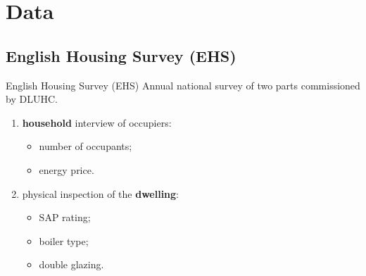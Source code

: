 \section{Data}

\subsection{English Housing Survey (EHS)}

\begin{frame}{English Housing Survey (EHS)}
    Annual national survey of two parts commissioned by 
    DLUHC.

    \begin{enumerate}
        \item \textbf{household} interview of occupiers:
        \begin{itemize}
            \item number of occupants;
            \item energy price.
        \end{itemize}

        \pause

        \item physical inspection of the \textbf{dwelling}:
        \begin{itemize}
            \item SAP rating;
            \item boiler type;
            \item double glazing.
        \end{itemize}
    \end{enumerate}
\end{frame}

